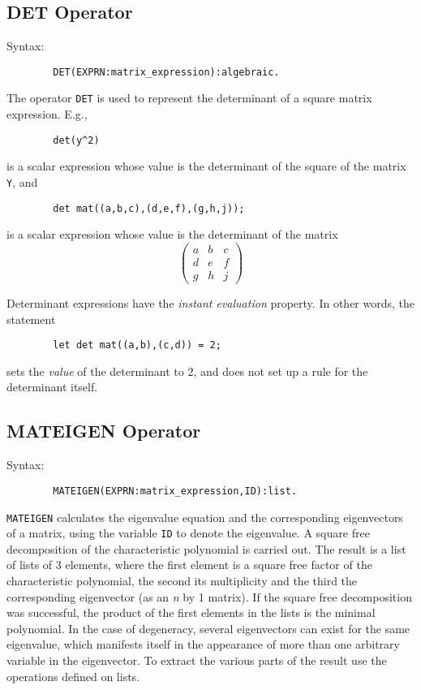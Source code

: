 \documentclass[11pt,letterpaper]{book}
\makeatletter
\newcommand{\underscore}{\_}
\newcommand{\ttindex}[1]{{\renewcommand{\_}{\protect\underscore}%
                          \index{#1@{\tt #1}}}}
\makeatother
\begin{document}
\subsection{DET Operator}\ttindex{DET}
Syntax:
{\small\begin{verbatim}
        DET(EXPRN:matrix_expression):algebraic.
\end{verbatim}}

The operator {\tt DET} is used to represent the determinant of a square
matrix expression.  E.g.,
{\small\begin{verbatim}
        det(y^2)
\end{verbatim}}
is a scalar expression whose value is the determinant of the square of the
matrix {\tt Y}, and
{\small\begin{verbatim}
        det mat((a,b,c),(d,e,f),(g,h,j));
\end{verbatim}}
is a scalar expression whose value is the determinant of the matrix
\[ \left( \begin{array}{lcr} a & b & c \\ d & e & f \\ g & h & j
\end{array} \right) \]

Determinant expressions have the {\em instant evaluation\/} property.
  In other words, the statement
{\small\begin{verbatim}
        let det mat((a,b),(c,d)) = 2;
\end{verbatim}}
sets the {\em value\/} of the determinant to 2, and does not set up a rule
for the determinant itself.

\subsection{MATEIGEN Operator}\ttindex{MATEIGEN}
Syntax:
{\small\begin{verbatim}
        MATEIGEN(EXPRN:matrix_expression,ID):list.
\end{verbatim}}

{\tt MATEIGEN} calculates the eigenvalue equation and the corresponding
eigenvectors of a matrix, using the variable {\tt ID} to denote the
eigenvalue.  A square free decomposition of the characteristic polynomial
is carried out.  The result is a list of lists of 3 elements, where the
first element is a square free factor of the characteristic polynomial,
the second its multiplicity and the third the corresponding eigenvector
(as an {\em n} by 1 matrix).  If the square free decomposition was
successful, the product of the first elements in the lists is the minimal
polynomial.  In the case of degeneracy, several eigenvectors can exist for
the same eigenvalue, which manifests itself in the appearance of more than
one arbitrary variable in the eigenvector.  To extract the various parts
of the result use the operations defined on lists.
\end{document}
